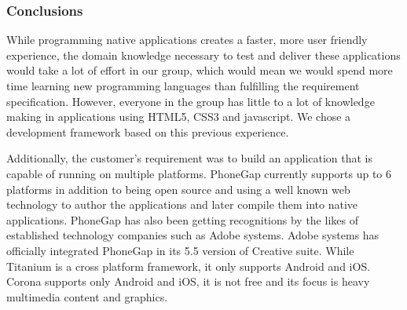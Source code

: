 \subsubsection{Conclusions}
While programming native applications creates a faster, more user friendly experience, the domain knowledge necessary to test and deliver these applications would take a lot of effort in our group, which would mean we would spend more time learning new programming languages than fulfilling the requirement specification. However, everyone in the group has little to a lot of knowledge making in applications using HTML5, CSS3 and javascript. We chose a development framework based on this previous experience.

Additionally, the customer's requirement was to build an application that is capable of running on multiple platforms. PhoneGap currently supports up to 6 platforms in addition to being open source and using a well known web technology to author the applications and later compile them into native applications. PhoneGap has also been getting recognitions by the likes of established technology companies such as Adobe systems.  Adobe systems has officially integrated PhoneGap in its 5.5 version of Creative suite. While Titanium is a cross platform framework, it only supports Android and iOS. Corona supports only Android and iOS, it is not free and its focus is heavy multimedia content and graphics.

